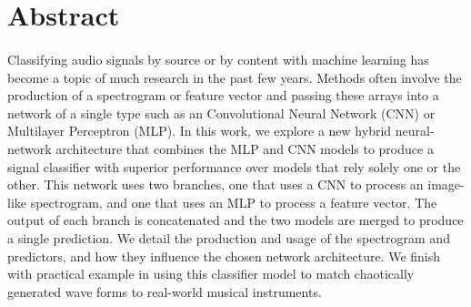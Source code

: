 \documentclass[12pt,letterpaper]{article}
\begin{document}

\section{Abstract}

\paragraph*{}Classifying audio signals by source or by content with machine learning has become a topic of much research in the past few years. Methods often involve the production of a spectrogram or feature vector and passing these arrays into a network of a single type such as an Convolutional Neural Network (CNN) or Multilayer Perceptron (MLP). In this work, we explore a new hybrid neural-network architecture that combines the MLP and CNN models to produce a signal classifier with superior performance over models that rely solely one or the other. This network uses two branches, one that uses a CNN to process an image-like spectrogram, and one that uses an MLP to process a feature vector. The output of each branch is concatenated and the two models are merged to produce a single prediction. We detail the production and usage of the spectrogram and predictors, and how they influence the chosen network architecture. We finish with practical example in using this classifier model to match chaotically generated wave forms to real-world musical instruments.

\end{document}
